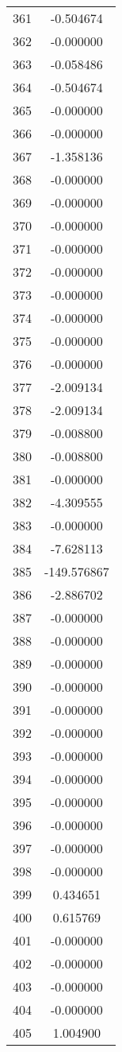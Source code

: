 \documentclass[12pt]{article}
\begin{document}
\begin{longtable}{@{}cc@{}}
361 & -0.504674 \\
362 & -0.000000 \\
363 & -0.058486 \\
364 & -0.504674 \\
365 & -0.000000 \\
366 & -0.000000 \\
367 & -1.358136 \\
368 & -0.000000 \\
369 & -0.000000 \\
370 & -0.000000 \\
371 & -0.000000 \\
372 & -0.000000 \\
373 & -0.000000 \\
374 & -0.000000 \\
375 & -0.000000 \\
376 & -0.000000 \\
377 & -2.009134 \\
378 & -2.009134 \\
379 & -0.008800 \\
380 & -0.008800 \\
381 & -0.000000 \\
382 & -4.309555 \\
383 & -0.000000 \\
384 & -7.628113 \\
385 & -149.576867 \\
386 & -2.886702 \\
387 & -0.000000 \\
388 & -0.000000 \\
389 & -0.000000 \\
390 & -0.000000 \\
391 & -0.000000 \\
392 & -0.000000 \\
393 & -0.000000 \\
394 & -0.000000 \\
395 & -0.000000 \\
396 & -0.000000 \\
397 & -0.000000 \\
398 & -0.000000 \\
399 & 0.434651 \\
400 & 0.615769 \\
401 & -0.000000 \\
402 & -0.000000 \\
403 & -0.000000 \\
404 & -0.000000 \\
405 & 1.004900 \\

\end{longtable}
\end{document}

